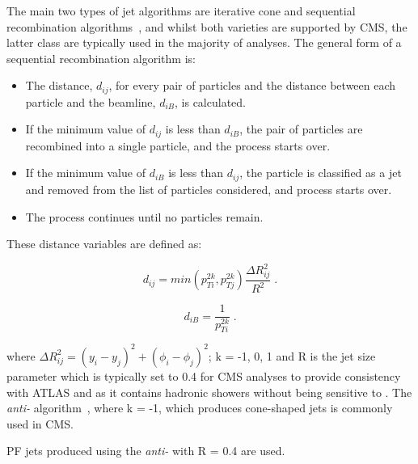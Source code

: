 {The main two types of jet algorithms are iterative cone and sequential recombination algorithms~\cite{Salam:2009jx}, and whilst both varieties are supported by CMS, the latter class are typically used in the majority of analyses.
The general form of a sequential recombination algorithm is:
\begin{itemize}
\item The distance, $d_{ij}$, for every pair of particles and the distance between each particle and the beamline, $d_{iB}$, is calculated.
\item If the minimum value of $d_{ij}$ is less than $d_{iB}$, the pair of particles are recombined into a single particle, and the process starts over.
\item If the minimum value of $d_{iB}$ is less than $d_{ij}$, the particle is classified as a jet and removed from the list of particles considered, and process starts over.
\item The process continues until no particles remain.
\end{itemize}

These distance variables are defined as:

\begin{equation}
d_{ij} = min(p^{2k}_{Ti},p^{2k}_{Tj}) \frac{\Delta R^{2}_{ij}}{R^{2}} \;.
\label{eq:jetAlgo1}
\end{equation}

\begin{equation}
d_{iB} = \frac{1}{p^{2k}_{Ti}} \;.
\label{eq:jetAlgo2}
\end{equation}

where $\Delta R^{2}_{ij} = (y_{i} - y_{j})^{2} + (\phi_{i} - \phi_{j})^{2}$; k = -1, 0, 1 and R is the jet size parameter which is typically set to 0.4 for CMS analyses to provide consistency with ATLAS and as it contains hadronic showers without being sensitive to \PU.
The \emph{anti-\kt} algorithm~\cite{Cacciari:2008gp}, where k = -1, which produces cone-shaped jets is commonly used in CMS.

PF jets produced using the \emph{anti-\kt} with R = 0.4 are used.


}

